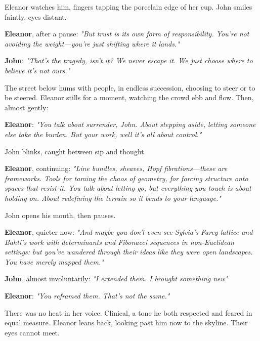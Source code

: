 \bigskip

Eleanor watches him, fingers tapping the porcelain edge of her cup. John smiles faintly, eyes distant.

\bigskip

\textbf{Eleanor}, after a pause: \textit{"But trust is its own form of responsibility. You’re not avoiding the weight—you’re just shifting where it lands."}

\textbf{John}: \textit{"That’s the tragedy, isn’t it? We never escape it. We just choose where to believe it’s not ours."}

\bigskip

The street below hums with people, in endless succession, choosing to steer or to be steered. Eleanor stills for a moment, watching the crowd ebb and flow. Then, almost gently:

\bigskip

\textbf{Eleanor}: \textit{"You talk about surrender, John. About stepping aside, letting someone else take the burden. But your work, well it’s all about control."}

\bigskip

John blinks, caught between sip and thought.

\bigskip

\textbf{Eleanor}, continuing: \textit{"Line bundles, sheaves, Hopf fibrations—these are frameworks. Tools for taming the chaos of geometry, for forcing structure onto spaces that resist it. You talk about letting go, but everything you touch is about holding on. About redefining the terrain so it bends to your language."}

\bigskip

John opens his mouth, then pauses.

\bigskip

\textbf{Eleanor}, quieter now: \textit{"And maybe you don’t even see Sylvia’s Farey lattice and Bahti’s work with determinants and Fibonacci sequences in non-Euclidean settings: but you’ve wandered through their ideas like they were open landscapes. You have merely mapped them."}

\bigskip

\textbf{John}, almost involuntarily: \textit{"I extended them. I brought something new"}

\bigskip

\textbf{Eleanor}: \textit{"You reframed them. That’s not the same."}

\bigskip

There was no heat in her voice. Clinical, a tone he both respected and feared in equal measure. Eleanor leans back, looking past him now to the skyline. Their eyes cannot meet.
\bigskip

